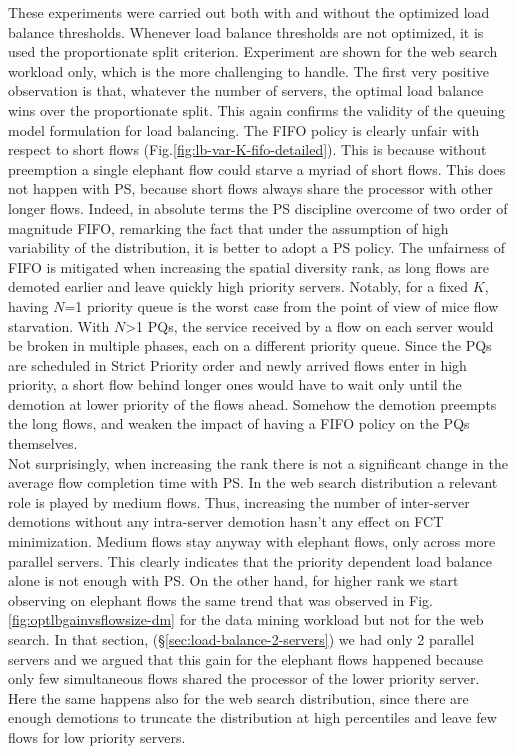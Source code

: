 These experiments were carried out both with and without the optimized load balance thresholds. Whenever load balance thresholds are not optimized, it is used the proportionate split criterion. Experiment are shown for the web search workload only, which is the more challenging to handle. The first very positive observation is that, whatever the number of servers, the optimal load balance wins over the proportionate split. This again confirms the validity of the queuing model formulation for load balancing. 
The FIFO policy is clearly unfair with respect to short flows (Fig.\ref{fig:lb-var-K-fifo-detailed}). This is because without preemption a single elephant flow could starve a myriad of short flows. This does not happen with PS, because short flows always share the processor with other longer flows. Indeed, in absolute terms the PS discipline overcome of two order of magnitude FIFO, remarking the fact that under the assumption of high variability of the distribution, it is better to adopt a PS policy. The unfairness of FIFO is mitigated when increasing the spatial diversity rank, as long flows are demoted earlier and leave quickly high priority servers. Notably, for a fixed $K$, having $N$=1 priority queue is the worst case from the point of view of mice flow starvation. With $N$>1 PQs, the service received by a flow on each server would be broken in multiple phases, each on a different priority queue. Since the PQs are scheduled in Strict Priority order and newly arrived flows enter in high priority, a short flow behind longer ones would have to wait only until the demotion at lower priority of the flows ahead. Somehow the demotion preempts the long flows, and weaken the impact of having a FIFO policy on the PQs themselves. \\
Not surprisingly, when increasing the rank there is not a significant change in the average flow completion time with PS. In the web search distribution a relevant role is played by medium flows. Thus, increasing the number of inter-server demotions without any intra-server demotion hasn't any effect on FCT minimization. Medium flows stay anyway with elephant flows, only across more parallel servers. This clearly indicates that the priority dependent load balance alone is not enough with PS. On the other hand, for higher rank we start observing on elephant flows the same trend that was observed in Fig.\ref{fig:optlbgainvsflowsize-dm} for the data mining workload but not for the web search. In that section, (\S \ref{sec:load-balance-2-servers}) we had only 2 parallel servers and we argued that this gain for the elephant flows happened because only few simultaneous flows shared the processor of the lower priority server. Here the same happens also for the web search distribution, since there are enough demotions to truncate the distribution at high percentiles and leave few flows for low priority servers.
